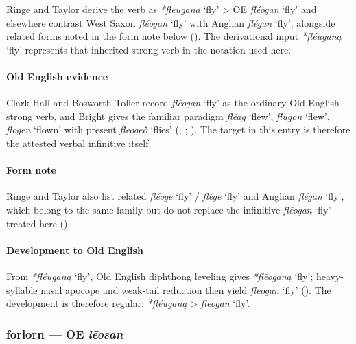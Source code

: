 \documentclass[
  british,
  a4paper,
]{article}
\providecommand{\Recon}[1]{\emph{*#1}}
\begin{document}
Ringe and Taylor derive the verb as \emph{*fleugana} `fly'
\textgreater{} OE \emph{fléogan} `fly' and elsewhere contrast West Saxon
\emph{fléogan} `fly' with Anglian \emph{flégan} `fly', alongside related
forms noted in the form note below (). The derivational input \Recon{fléuganą} `fly'
represents that inherited strong verb in the notation used here.

\paragraph{Old English evidence}\label{old-english-evidence-20}

Clark Hall and Bosworth-Toller record \emph{flēogan} `fly' as the
ordinary Old English strong verb, and Bright gives the familiar paradigm
\emph{flēag} `flew', \emph{flugon} `flew', \emph{flogen} `flown' with
present \emph{fleogeð} `flies' (; ;
). The target in
this entry is therefore the attested verbal infinitive itself.

\paragraph{Form note}\label{form-note-1}

Ringe and Taylor also list related \emph{fléoge} `fly' / \emph{flége}
`fly' and Anglian \emph{flégan} `fly', which belong to the same family
but do not replace the infinitive \emph{flēogan} `fly' treated here
().

\paragraph{Development to Old
English}\label{development-to-old-english-20}

From \Recon{fléuganą} `fly', Old English diphthong leveling gives
\Recon{flēoganą} `fly'; heavy-syllable nasal apocope and weak-tail
reduction then yield \emph{flēogan} `fly'
(). The development
is therefore regular: \emph{*fléuganą} \textgreater{} \emph{flēogan}
`fly'.

\subsubsection{\texorpdfstring{forlorn --- OE
\emph{lēosan}}{forlorn --- OE lēosan}}\label{forlorn-oe-lux113osan}
\end{document}
